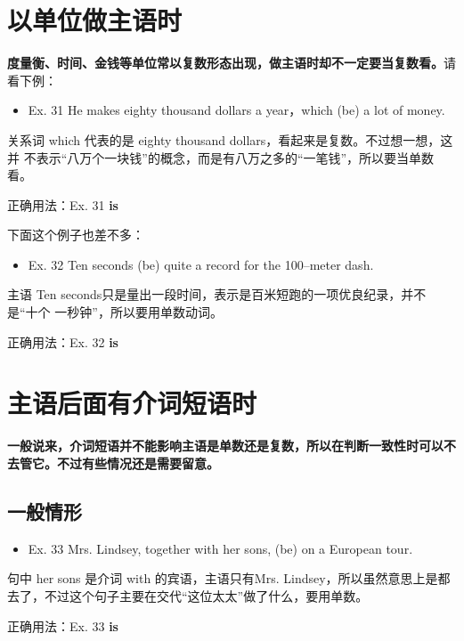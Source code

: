 \section{以单位做主语时}

\textbf{度量衡、时间、金钱等单位常以复数形态出现，做主语时却不一定要当复数看。}请看下例：
\begin{mybox}
\begin{itemize}
\item   Ex. 31 He makes eighty thousand dollars a year，which (be) a lot of
  money.
\end{itemize}

关系词 which 代表的是 eighty thousand dollars，看起来是复数。不过想一想，这并
不表示“八万个一块钱”的概念，而是有八万之多的“一笔钱”，所以要当单数看。

\tcblower

正确用法：Ex. 31 \textbf{is}
\end{mybox}

下面这个例子也差不多：
\begin{mybox}

\begin{itemize}
\item   Ex. 32 Ten seconds (be) quite a record for the 100--meter dash.
\end{itemize}

主语 Ten seconds只是量出一段时间，表示是百米短跑的一项优良纪录，并不是“十个
一秒钟”，所以要用单数动词。

\tcblower

正确用法：Ex. 32 \textbf{is}
\end{mybox}

\section{主语后面有介词短语时}

\textbf{一般说来，介词短语并不能影响主语是单数还是复数，所以在判断一致性时可以不
  去管它。不过有些情况还是需要留意。}

\subsection{一般情形}

\begin{mybox}
\begin{itemize}
\item  Ex. 33 Mrs. Lindsey, together with her sons, (be) on a European tour.
\end{itemize}

句中 her sons 是介词 with 的宾语，主语只有Mrs. Lindsey，所以虽然意思上是都
去了，不过这个句子主要在交代“这位太太”做了什么，要用单数。

\tcblower

正确用法：Ex. 33 \textbf{is}
\end{mybox}

